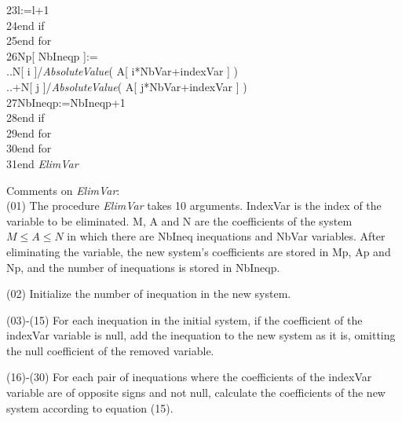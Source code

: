 \documentclass[12pt, a4paper]{article}
\begin{document}
\begin{ttfamily}
23\quad\quad\quad\quad\quad\quad\quad l:=l+1\\
24\quad\quad\quad\quad\quad\quad end if\\
25\quad\quad\quad\quad\quad end for\\
26\quad\quad\quad\quad\quad Np[ NbIneqp ]:=\\
..\quad\quad\quad\quad\quad\quad N[ i ]/{\em AbsoluteValue}( A[ i*NbVar+indexVar ] )\\
..\quad\quad\quad\quad\quad\quad +N[ j ]/{\em AbsoluteValue}( A[ j*NbVar+indexVar ] )\\
27\quad\quad\quad\quad\quad NbIneqp:=NbIneqp+1\\
28\quad\quad\quad\quad end if\\
29\quad\quad\quad end for\\
30\quad\quad end for\\
31\quad end {\em ElimVar}\\
\end{ttfamily}

Comments on {\em ElimVar}:\\

(01) The procedure {\em ElimVar} takes 10 arguments. IndexVar is the index of the variable to be eliminated. M, A and N are the coefficients of the system $M\le A\le N$ in which there are NbIneq inequations and NbVar variables. After eliminating the variable, the new system's coefficients are stored in Mp, Ap and Np, and the number of inequations is stored in NbIneqp.

(02) Initialize the number of inequation in the new system.

(03)-(15) For each inequation in the initial system, if the coefficient of the indexVar variable is null, add the inequation to the new system as it is, omitting the null coefficient of the removed variable.

(16)-(30) For each pair of inequations where the coefficients of the indexVar variable are of opposite signs and not null, calculate the coefficients of the new system according to equation (15).\\
\end{document}
